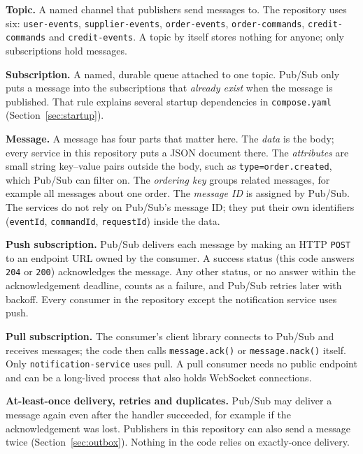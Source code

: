 \documentclass[11pt,a4paper]{article}
\newcommand{\code}[1]{\nolinkurl{#1}}
\begin{document}
\textbf{Topic.} A named channel that publishers send messages to. The repository uses
six: \code{user-events}, \code{supplier-events}, \code{order-events},
\code{order-commands}, \code{credit-commands} and \code{credit-events}. A topic by itself
stores nothing for anyone; only subscriptions hold messages.

\textbf{Subscription.} A named, durable queue attached to one topic. Pub/Sub only puts a
message into the subscriptions that \emph{already exist} when the message is
published. That rule explains several startup dependencies in \code{compose.yaml}
(Section~\ref{sec:startup}).

\textbf{Message.} A message has four parts that matter here. The \emph{data} is
the body; every service in this repository puts a JSON document there. The
\emph{attributes} are small string key--value pairs outside the body, such as
\code{type=order.created}, which Pub/Sub can filter on. The \emph{ordering key} groups
related messages, for example all messages about one order. The \emph{message ID} is
assigned by Pub/Sub. The services do not rely on Pub/Sub's message ID; they put their own
identifiers (\code{eventId}, \code{commandId}, \code{requestId}) inside the data.

\textbf{Push subscription.} Pub/Sub delivers each message by making an HTTP
\code{POST} to an endpoint URL owned by the consumer. A success status (this code answers
\code{204} or \code{200}) acknowledges the message. Any other status, or no answer within
the acknowledgement deadline, counts as a failure, and Pub/Sub retries later with
backoff. Every consumer in the repository except the notification service uses push.

\textbf{Pull subscription.} The consumer's client library connects to Pub/Sub and
receives messages; the code then calls \code{message.ack()} or \code{message.nack()}
itself. Only \code{notification-service} uses pull. A pull consumer needs no public
endpoint and can be a long-lived process that also holds WebSocket connections.

\textbf{At-least-once delivery, retries and duplicates.} Pub/Sub may deliver a message
again even after the handler succeeded, for example if the acknowledgement was lost.
Publishers in this repository can also send a message twice (Section~\ref{sec:outbox}).
Nothing in the code relies on exactly-once delivery.
\end{document}
